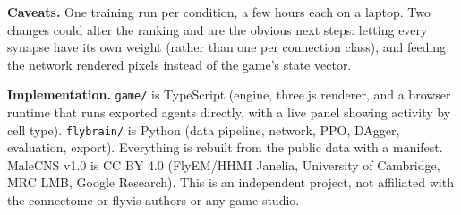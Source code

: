 \documentclass[10pt,a4paper]{article}
\begin{document}
\textbf{Caveats.} One training run per condition, a few hours each on a laptop. Two changes could alter the
ranking and are the obvious next steps: letting every synapse have its own weight (rather than one per connection
class), and feeding the network rendered pixels instead of the game's state vector.

\textbf{Implementation.} \texttt{game/} is TypeScript (engine, three.js renderer, and a browser runtime that runs
exported agents directly, with a live panel showing activity by cell type). \texttt{flybrain/} is Python (data
pipeline, network, PPO, DAgger, evaluation, export). Everything is rebuilt from the public data with a manifest.
MaleCNS v1.0 is CC BY 4.0 (FlyEM/HHMI Janelia, University of Cambridge, MRC LMB, Google Research). This is an
independent project, not affiliated with the connectome or flyvis authors or any game studio.
\end{document}
